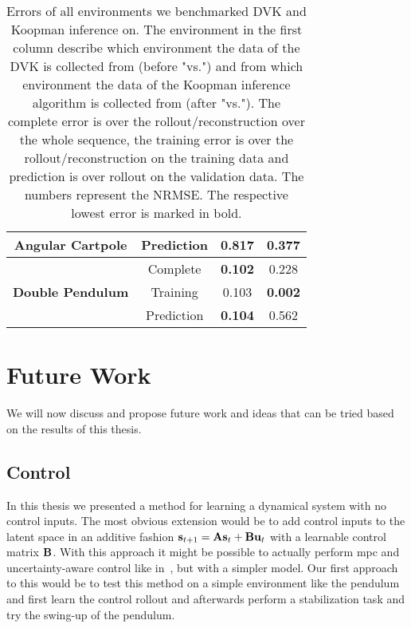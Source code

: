 \begin{table}
\begin{tabular}{c|c|c|c}
				  \textbf{Angular Cartpole}   &       Prediction       &               0.817               &       \textbf{0.377}       \\ \hline
				                              &        Complete        &          \textbf{0.102}           &           0.228            \\
				  \textbf{Double Pendulum}    &        Training        &               0.103               &       \textbf{0.002}       \\
				                              &       Prediction       &          \textbf{0.104}           &           0.562
			\end{tabular}
			\caption{Errors of all environments we benchmarked DVK and Koopman inference on. The environment in the first column describe which environment the data of the DVK is collected from (before "vs.") and from which environment the data of the Koopman inference algorithm is collected from (after "vs."). The complete error is over the rollout/reconstruction over the whole sequence, the training error is over the rollout/reconstruction on the training data and prediction is over rollout on the validation data. The numbers represent the NRMSE. The respective lowest error is marked in bold.}
			\label{tab:mortonComparison}
		\end{table}

%

\section{Future Work}
	\label{sec:futureWork}

	We will now discuss and propose future work and ideas that can be tried based on the results of this thesis.

	\subsection{Control}
		In this thesis we presented a method for learning a dynamical system with no control inputs. The most obvious extension would be to add control inputs to the latent space in an additive fashion \( \boldsymbol{\mathrm{s}}_{t + 1} = \boldsymbol{\mathrm{A}} \boldsymbol{\mathrm{s}}_t + \boldsymbol{\mathrm{B}} \boldsymbol{\mathrm{u}}_t \) with a learnable control matrix \(\boldsymbol{\mathrm{B}}\). With this approach it might be possible to actually perform \ac{mpc} and uncertainty-aware control like in~\cite{mortonDeepVariationalKoopman2019a}, but with a simpler model. Our first approach to this would be to test this method on a simple environment like the pendulum and first learn the control rollout and afterwards perform a stabilization task and try the swing-up of the pendulum.

